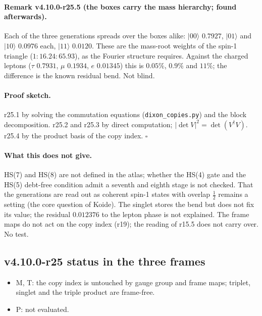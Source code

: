\paragraph{Remark v4.10.0-r25.5 (the boxes carry the mass hierarchy; found afterwards).}
Each of the three generations spreads over the boxes alike: \(|00\rangle\) \(0.7927\), \(|01\rangle\) and \(|10\rangle\) \(0.0976\) each, \(|11\rangle\)
\(0.0120\).  These are the mass-root weights of the spin-1 triangle (\(1:16.24:65.93\)), as the Fourier structure requires.  Against the charged
leptons (\(\tau\) \(0.7931\), \(\mu\) \(0.1934\), \(e\) \(0.01345\)) this is \(0.05\%\), \(0.9\%\) and \(11\%\); the difference is the known residual bend.  Not
blind.

\paragraph{Proof sketch.}
r25.1 by solving the commutation equations (\texttt{dixon\_\allowbreak copies.py}) and the block decomposition.  r25.2 and r25.3 by direct
computation; \(|\det V|^2=\det(V^\dagger V)\).  r25.4 by the product basis of the copy index.  \(\square\)

\paragraph{What this does not give.}
HS(7) and HS(8) are not defined in the atlas; whether the HS(4) gate and the HS(5) debt-free condition admit a seventh and eighth stage is not
checked.  That the generations are read out as coherent spin-1 states with overlap \(\tfrac12\) remains a setting (the core question of
Koide).  The singlet stores the bend but does not fix its value; the residual \(0.012376\) to the lepton phase is not explained.  The frame maps
do not act on the copy index (r19); the reading of r15.5 does not carry over.  No test.

\subsection*{v4.10.0-r25 status in the three frames}
\label{subsec:v4100-r25-frames}

\begin{itemize}[leftmargin=2em]
\item M, T: the copy index is untouched by gauge group and frame maps; triplet, singlet and the triple product are frame-free.
\item P: not evaluated.
\end{itemize}

